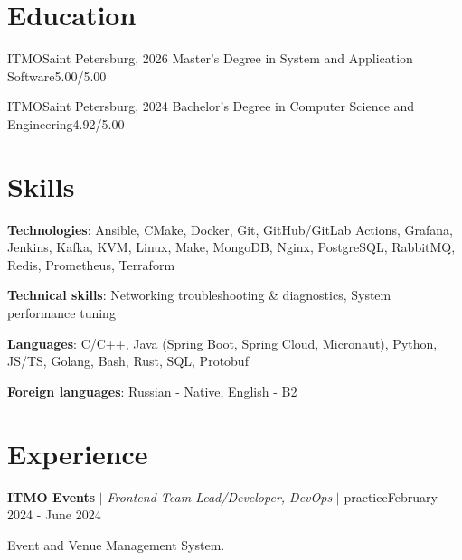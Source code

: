 \documentclass[letterpaper,11pt]{article}
\begin{document}
\section{Education}
\resumeSubHeadingListStart
  \resumeSubheading
    {ITMO}{Saint Petersburg, 2026}
    {Master’s Degree in System and Application Software}{5.00/5.00}

  \resumeSubheading
    {ITMO}{Saint Petersburg, 2024}
    {Bachelor’s Degree in Computer Science and Engineering}{4.92/5.00}
\resumeSubHeadingListEnd

\section{Skills}
\resumeSubHeadingListStart
  \small{\item{
    \textbf{Technologies}{: Ansible, CMake, Docker, Git, GitHub/GitLab Actions, Grafana, Jenkins, Kafka, KVM, Linux, Make, MongoDB, Nginx, PostgreSQL, RabbitMQ, Redis, Prometheus, Terraform }

    \textbf{Technical skills}{: Networking troubleshooting \& diagnostics, System performance tuning}

   \textbf{Languages}{: C/C++, Java (Spring Boot, Spring Cloud, Micronaut), Python, JS/TS, Golang, Bash, Rust, SQL, Protobuf }

   \textbf{Foreign languages}{: Russian - Native, English - B2}%
  }}
\resumeSubHeadingListEnd

\section{Experience}
\resumeSubHeadingListStart
  \resumeExperienceHeading
    {\textbf{ITMO Events} $|$ \footnotesize\emph{Frontend Team Lead/Developer, DevOps} $|$ practice}{February 2024 - June 2024}

    {\vspace{-10pt}\small Event and Venue Management System.\vspace{-7pt}}

  \resumeItemListStart
  \resumeItemListEnd
\end{document}
